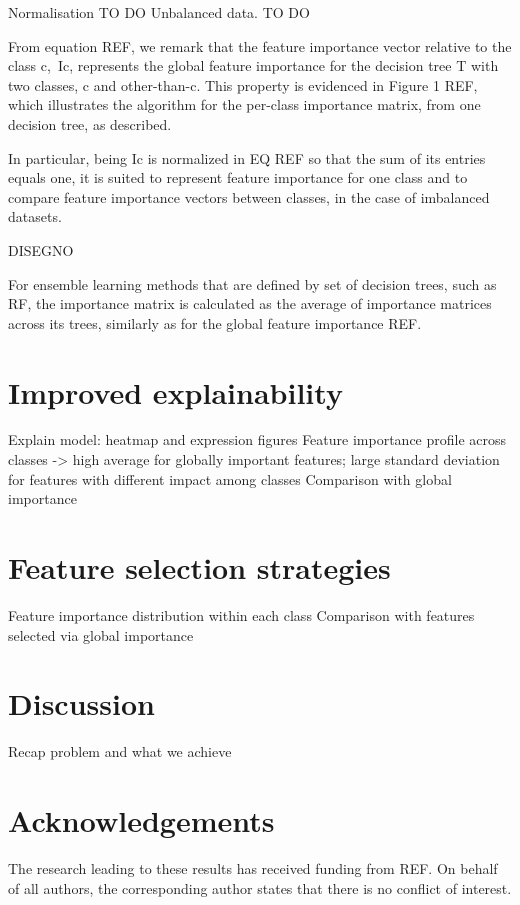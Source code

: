 \documentclass[12pt,a4paper]{article}
\theoremstyle{definition}
\theoremstyle{plain}
\theoremstyle{remark}
\begin{document}
Normalisation TO DO
Unbalanced data. TO DO

From equation REF, we remark that the feature importance vector relative to the class c, Ic, represents the global feature importance for the decision tree T with two classes, c and other-than-c. This property is evidenced in Figure 1 REF, which illustrates the algorithm for the per-class importance matrix, from one decision tree, as described.

In particular, being Ic is normalized in EQ REF so that the sum of its entries equals one, it is suited to represent feature importance for one class and to compare feature importance vectors between classes, in the case of imbalanced datasets.

DISEGNO

For ensemble learning methods that are defined by set of decision trees, such as RF, the importance matrix is calculated as the average of importance matrices across its trees, similarly as for the global feature importance REF.

\section{Improved explainability}\label{sec:explanability}

Explain model: heatmap and expression figures
Feature importance profile across classes -> high average for globally important features; large standard deviation for features with different impact among classes
Comparison with global importance

\section{Feature selection strategies}\label{subsec:feature_selection}
Feature importance distribution within each class
Comparison with features selected via global importance

\section{Discussion}\label{sec:discussion}
Recap problem and what we achieve

\section*{Acknowledgements}
The research leading to these results has received funding from REF.
On behalf of all authors, the corresponding author states that there is no conflict of interest.


\end{document}
